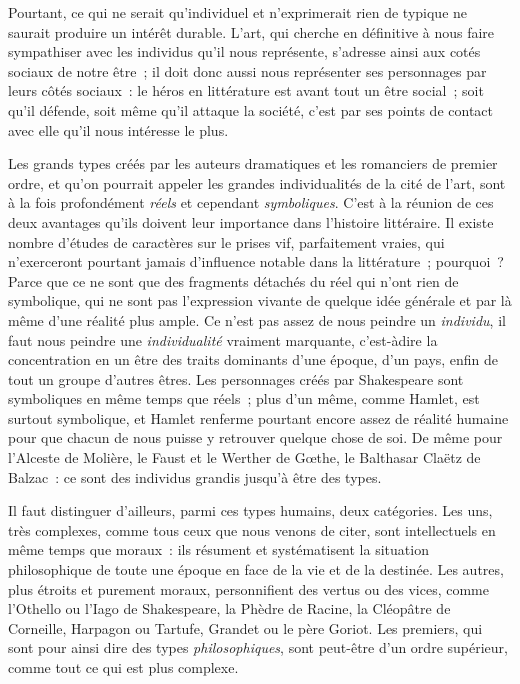 \documentclass[french,twoside]{book} %
\begin{document}
Pourtant, ce qui ne serait qu’individuel et n’exprimerait rien de typique ne saurait produire un intérêt durable. L’art, qui cherche en définitive à nous faire sympathiser avec les individus qu’il nous représente, s’adresse ainsi aux cotés sociaux de notre être ; il doit donc aussi nous représenter ses personnages par leurs côtés sociaux : le héros en littérature est avant tout un être social ; soit qu’il défende, soit même qu’il attaque la société, c’est par ses points de contact avec elle qu’il nous intéresse le plus.\par
Les grands types créés par les auteurs dramatiques et les romanciers de premier ordre, et qu’on pourrait appeler les grandes individualités de la cité de l’art, sont à la fois profondément \emph{réels} et cependant \emph{symboliques}. C’est à la réunion de ces deux avantages qu’ils doivent leur importance dans l’histoire littéraire. Il existe nombre d’études de caractères sur le prises vif, parfaitement vraies, qui n’exerceront pourtant jamais d’influence notable dans la littérature ; pourquoi ? Parce que ce ne sont que des fragments détachés du réel qui n’ont rien de symbolique, qui ne sont pas l’expression vivante de quelque idée générale et par là même d’une réalité plus ample. Ce n’est pas assez de nous peindre un \emph{individu}, il faut nous peindre une \emph{individualité} vraiment marquante, c’est-àdire la concentration en un être des traits dominants d’une époque, d’un pays, enfin de tout un groupe d’autres êtres. Les personnages créés par Shakespeare sont symboliques en même temps que réels ; plus d’un même, comme Hamlet, est surtout symbolique, et Hamlet renferme pourtant encore assez de réalité humaine pour que chacun de nous puisse y retrouver quelque chose de soi. De même pour l’Alceste de Molière, le Faust et le Werther de Gœthe, le Balthasar Claëtz de Balzac : ce sont des individus grandis jusqu’à être des types.\par
Il faut distinguer d’ailleurs, parmi ces types humains, deux catégories. Les uns, très complexes, comme tous ceux que nous venons de citer, sont intellectuels en même temps que moraux : ils résument et systématisent la situation philosophique de toute une époque en face de la vie et de la destinée. Les autres, plus étroits et purement moraux, personnifient des vertus ou des vices, comme l’Othello ou l’Iago de Shakespeare, la Phèdre de Racine, la Cléopâtre de Corneille, Harpagon ou Tartufe, Grandet ou le père Goriot. Les premiers, qui sont pour ainsi dire des types \emph{philosophiques}, sont peut-être d’un ordre supérieur, comme tout ce qui est plus complexe.\par
\end{document}
